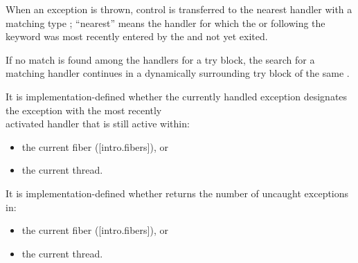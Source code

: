 
When an exception is thrown, control is transferred to the nearest handler
with a matching type ; ``nearest'' means the handler for
which the  or
 following the  keyword was
most recently entered by the  and
not yet exited.




If no match is found among the handlers for a try block, the search for a
matching handler continues in a dynamically surrounding try block of the same
.


\cbstart
It is implementation-defined whether the currently handled exception
designates the exception with the most recently\\
activated handler that is still active within:
\begin{itemize}
    \item the current fiber ([intro.fibers]), or
    \item the current thread.
\end{itemize}
\cbend


\cbstart
It is implementation-defined whether  returns
the number of uncaught exceptions in:
\begin{itemize}
    \item the current fiber ([intro.fibers]), or
    \item the current thread.
\end{itemize}
\cbend


\setcounter{section}{33}
\setcounter{subsection}{11}
\setcounter{secnumdepth}{4}

